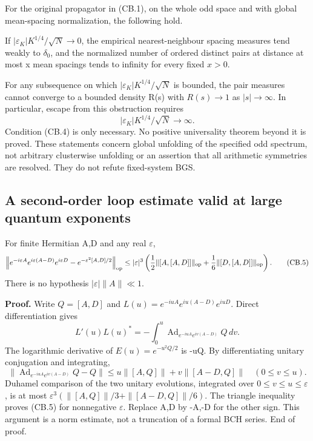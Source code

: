 \begin{theorem}\label{pass1:ch07_coboundary_resonance-2} For the original propagator in (CB.1), on the whole odd space and with global mean-spacing normalization, the following hold.
\end{theorem}

If \(|\varepsilon_K|K^{1/4}/\sqrt N\to0\), the empirical nearest-neighbour spacing measures tend weakly to \(\delta_0\), and the normalized number of ordered distinct pairs at distance at most x mean spacings tends to infinity for every fixed \(x>0\).

For any subsequence on which \(|\varepsilon_K|K^{1/4}/\sqrt N\) is bounded, the pair measures cannot converge to a bounded density R(s) with \(R(s)\to1\) as \(|s|\to\infty\). In particular, escape from this obstruction requires \[
 |\varepsilon_K|K^{1/4}/\sqrt N\longrightarrow\infty.            \tag{CB.4}
\] Condition (CB.4) is only necessary. No positive universality theorem beyond it is proved. These statements concern global unfolding of the specified odd spectrum, not arbitrary clusterwise unfolding or an assertion that all arithmetic symmetries are resolved. They do not refute fixed-system BGS.

\subsection{A second-order loop estimate valid at large quantum exponents}\label{coboundary:a-second-order-loop-estimate-valid-at-large-quantum-exponents}

\begin{lemma}\label{pass1:ch07_coboundary_resonance-3} For finite Hermitian A,D and any real \(\varepsilon\), \[
 \left\|e^{-i\varepsilon A}e^{i\varepsilon(A-D)}e^{i\varepsilon D}
       -e^{-\varepsilon^2[A,D]/2}\right\|_{\rm op}
 \leq |\varepsilon|^3\left(
       \frac12\|[A,[A,D]]\|_{\rm op}
       +\frac16\|[D,[A,D]]\|_{\rm op}\right).                  \tag{CB.5}
\] There is no hypothesis \(|\varepsilon|\|A\|\ll1\).
\end{lemma}

\textbf{Proof.} Write \(Q=[A,D]\) and \(L(u)=e^{-iuA}e^{iu(A-D)}e^{iuD}\). Direct differentiation gives \[
 L'(u)L(u)^*=-\int_0^u
       \operatorname{Ad}_{e^{-iuA}e^{iv(A-D)}}Q\,dv.
\] The logarithmic derivative of \(E(u)=e^{-u^2Q/2}\) is -uQ. By differentiating unitary conjugation and integrating, \[
 \|\operatorname{Ad}_{e^{-iuA}e^{iv(A-D)}}Q-Q\|
 \leq u\|[A,Q]\|+v\|[A-D,Q]\|\quad(0\leq v\leq u).
\] Duhamel comparison of the two unitary evolutions, integrated over \(0\leq v\leq u\leq\varepsilon\), is at most \(\varepsilon^3(\|[A,Q]\|/3+\|[A-D,Q]\|/6)\). The triangle inequality proves (CB.5) for nonnegative \(\varepsilon\). Replace A,D by -A,-D for the other sign. This argument is a norm estimate, not a truncation of a formal BCH series. End of proof.

